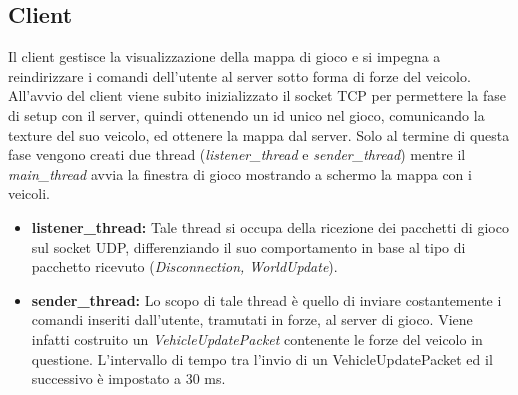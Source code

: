 \documentclass{article}
\begin{document}
\subsection*{Client}
Il client gestisce la visualizzazione della mappa di gioco e si impegna a reindirizzare i comandi dell'utente al server sotto forma di forze del veicolo. All'avvio del client viene subito inizializzato il socket TCP per permettere la fase di setup con il server, quindi ottenendo un id unico nel gioco, comunicando la texture del suo veicolo, ed ottenere la mappa dal server. Solo al termine di questa fase vengono creati due thread (\textit{listener\_thread} e \textit{sender\_thread}) mentre il \textit{main\_thread} avvia la finestra di gioco mostrando a schermo la mappa con i veicoli.

\begin{itemize}
\item{\textbf{listener\_thread:}}
Tale thread si occupa della ricezione dei pacchetti di gioco sul socket UDP, differenziando il suo comportamento in base al tipo di pacchetto ricevuto (\textit{Disconnection, WorldUpdate}).
\item{\textbf{sender\_thread:}}
Lo scopo di tale thread è quello di inviare costantemente i comandi inseriti dall'utente, tramutati in forze, al server di gioco. Viene infatti costruito un \textit{VehicleUpdatePacket} contenente le forze del veicolo in questione. L'intervallo di tempo tra l'invio di un VehicleUpdatePacket ed il successivo è impostato a 30 ms.
\end{itemize}
\end{document}

